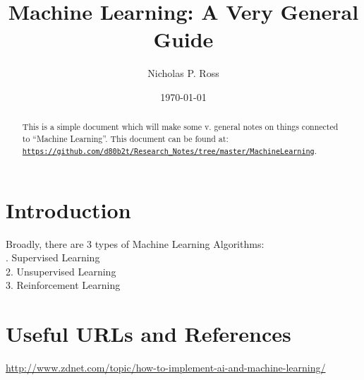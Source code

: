 \documentclass[11pt]{article}
\begin{document}
\title{Machine Learning: A Very General Guide}
\author{Nicholas P. Ross}
\date{\today}
\maketitle


\begin{abstract}
This is a simple document which will make some v. general notes on 
things connected to ``Machine Learning''. This document can be found at:\\
\href{https://github.com/d80b2t/Research_Notes/tree/master/MachineLearning}{\tt https://github.com/d80b2t/Research\_Notes/tree/master/MachineLearning}. 
\end{abstract}



\section{Introduction}
Broadly, there are 3 types of Machine Learning Algorithms:\\

. Supervised Learning\\
2. Unsupervised Learning\\
3. Reinforcement Learning\\



 

\section{Useful URLs and References}
\href{http://www.zdnet.com/topic/how-to-implement-ai-and-machine-learning/}{http://www.zdnet.com/topic/how-to-implement-ai-and-machine-learning/}\\

















\end{document}
